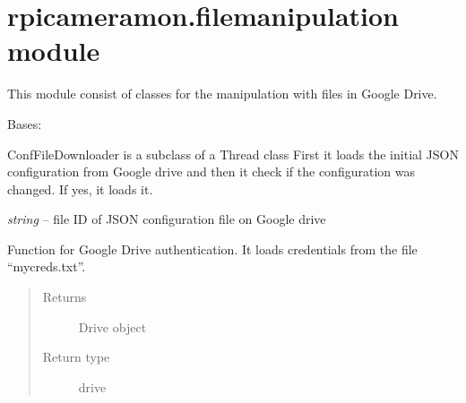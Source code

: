 \documentclass[letterpaper,10pt,english]{sphinxmanual}
\begin{document}
\chapter{rpicameramon.filemanipulation module}
\label{rpicameramon:rpicameramon-filemanipulation-module}
This module consist of classes for the manipulation with files in Google Drive.
\label{rpicameramon:module-rpicameramon.filemanipulation}

\begin{fulllineitems}
\label{rpicameramon:rpicameramon.filemanipulation.ConfFileDownloader}
Bases: 

ConfFileDownloader is a subclass of a Thread class
First it loads the initial JSON configuration from Google drive
and then it check if the configuration was changed. If yes, it loads it.

\begin{fulllineitems}
\label{rpicameramon:rpicameramon.filemanipulation.ConfFileDownloader.filename}
\emph{string} -- file ID of JSON configuration file on Google drive

\end{fulllineitems}


\begin{fulllineitems}
\label{rpicameramon:rpicameramon.filemanipulation.ConfFileDownloader.auth}
Function for Google Drive authentication. It loads credentials from the
file ``mycreds.txt''.
\begin{quote}\begin{description}
\item[{Returns}] \leavevmode
Drive object

\item[{Return type}] \leavevmode
drive

\end{description}\end{quote}


\end{fulllineitems}
\end{fulllineitems}
\end{document}
